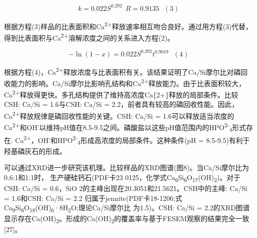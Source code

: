 \documentclass[11pt]{article}
\begin{document}
\[k = 0.022S^{0.292} \ \ R = 0.9135 \ \ \ (3)\]

\setlength{\parindent}{1.0cm}
根据方程(3)样品的比表面积和Ca\textsuperscript{2+}释放速率相互吻合良好。通过用方程(3)代替，得到比表面积与Ca\textsuperscript{2+}溶解浓度之间的关系进入方程(2)。
\par

\[-\ln(1-x) = 0.022S^{0.292}t^{0.9019} \ \ \ (4)\]

\setlength{\parindent}{1.0cm}
根据方程(4)，Ca\textsuperscript{2+}释放浓度与比表面积有关。该结果证明了Ca/Si摩尔比对磷回收能力的影响。Ca/Si摩尔比影响孔结构和Ca\textsuperscript{2+}释放能力。由于比表面积较大，Ca\textsuperscript{2+}释放得更快。多孔结构提供了维持高浓度Ca\{2+\}释放的局部条件。比较CSH: Ca/Si = 1.6与CSH: Ca/Si = 2.2，前者具有较高的磷回收性能。因此，Ca\textsuperscript{2+}释放规律是磷回收性能的关键。CSH: Ca/Si = 1.6可以释放适当浓度的Ca\textsuperscript{2+}和OH\textsuperscript{-}以维持pH值在8.5-9.5之间。磷酸盐以这些pH值范围内的HPO\textsuperscript{2-}\textsubscript{4}形式存在.\cite{liu12_remov_high_concen_phosp_by_calcit} Ca\textsuperscript{2+}，OH\textsuperscript{-}和HPO\textsuperscript{2-}\textsubscript{4}形成高浓度的局部条件。这种条件(pH = 8.5-9.5)有利于羟基磷灰石的形成。
\par

\setlength{\parindent}{1.0cm}
可以通过XRD进一步研究该机理。比较样品的XRD图谱(图8)。当Ca/Si摩尔比为0.6:1和1:1时，
生产硬硅钙石(PDF卡23 0125，化学式Ca\textsubscript{6}Si\textsubscript{6}O\textsubscript{17}(OH)\textsubscript{2})。对于CSH: Ca/Si =
0.6，SiO 2的主峰出现在20.3051和21.5621。CSH中的主峰: Ca/Si = 1.6和CSH: Ca/Si = 2.2
归属于jennite(PDF卡18-1206;式Ca\textsubscript{9}Si\textsubscript{6}O\textsubscript{18}(OH)\textsubscript{6}·8H\textsubscript{2}O;理论Ca/Si摩尔比
为1.5)。CSH: Ca/Si = 2.2的XRD图谱显示存在Ca(OH)\textsubscript{2}。形成的Ca(OH)\textsubscript{2}的覆盖率与基于FESEM观察的结果完全一致[27]。
\par
\end{document}
